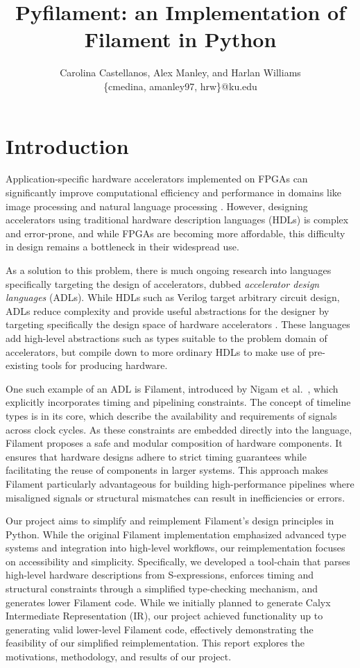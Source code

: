 \documentclass[12pt,a4paper]{article}
\title{Pyfilament: an Implementation of Filament in Python}
\author{Carolina Castellanos, Alex Manley, and Harlan Williams\\\{cmedina, amanley97, hrw\}@ku.edu}
\date{}
\begin{document}
\maketitle

\section{Introduction}

Application-specific hardware accelerators implemented on FPGAs can significantly improve computational efficiency and performance in domains like image processing \cite{hegarty2014darkroom} and natural language processing \cite{khan21}. However, designing accelerators using traditional hardware description languages (HDLs) is complex and error-prone, and while FPGAs are becoming more affordable, this difficulty in design remains a bottleneck in their widespread use.

As a solution to this problem, there is much ongoing research into languages specifically targeting the design of accelerators, dubbed \emph{accelerator design languages} (ADLs). While HDLs such as Verilog target arbitrary circuit design, ADLs reduce complexity and provide useful abstractions for the designer by targeting specifically the design space of hardware accelerators \cite{sampson2021adl}. These languages add high-level abstractions such as types suitable to the problem domain of accelerators, but compile down to more ordinary HDLs to make use of pre-existing tools for producing hardware.

One such example of an ADL is Filament, introduced by Nigam et al.~\cite{nigam2023filament}, which explicitly incorporates timing and pipelining constraints. The concept of timeline types is in its core, which describe the availability and requirements of signals across clock cycles. As these constraints are embedded directly into the language, Filament proposes a safe and modular composition of hardware components. It ensures that hardware designs adhere to strict timing guarantees while facilitating the reuse of components in larger systems. This approach makes Filament particularly advantageous for building high-performance pipelines where misaligned signals or structural mismatches can result in inefficiencies or errors.

Our project aims to simplify and reimplement Filament’s design principles in Python. While the original Filament implementation emphasized advanced type systems and integration into high-level workflows, our reimplementation focuses on accessibility and simplicity. Specifically, we developed a tool-chain that parses high-level hardware descriptions from S-expressions, enforces timing and structural constraints through a simplified type-checking mechanism, and generates lower Filament code. While we initially planned to generate Calyx \cite{nigam2021calyx} Intermediate Representation (IR), our project achieved functionality up to generating valid lower-level Filament code, effectively demonstrating the feasibility of our simplified reimplementation. This report explores the motivations, methodology, and results of our project. 
\end{document}
